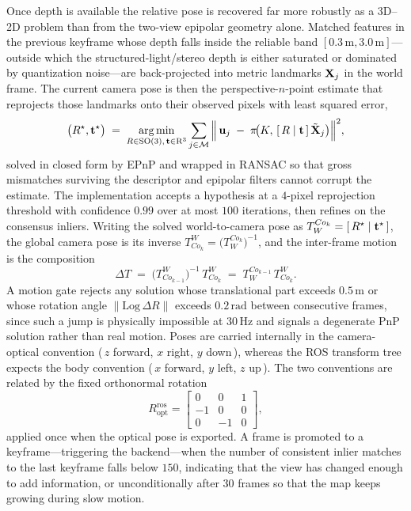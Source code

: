 Once depth is available the relative pose is recovered far more robustly as a 3D--2D problem than from the two-view epipolar geometry alone. Matched features in the previous keyframe whose depth falls inside the reliable band $[\ensuremath{0.3\,\mathrm{m}},\ensuremath{3.0\,\mathrm{m}}]$---outside which the structured-light/stereo depth is either saturated or dominated by quantization noise---are back-projected into metric landmarks $\mathbf{X}_j$ in the world frame. The current camera pose is then the perspective-$n$-point estimate that reprojects those landmarks onto their observed pixels with least squared error,
\begin{equation}
\big(R^{\star},\mathbf{t}^{\star}\big)
\;=\;
\operatorname*{arg\,min}_{R\in\mathrm{SO}(3),\,\mathbf{t}\in\mathrm{R}^{3}}
\sum_{j\in\mathcal{M}}
\Big\lVert\, \mathbf{u}_j \;-\; \pi\!\big(K,\,[\,R \mid \mathbf{t}\,]\,\tilde{\mathbf{X}}_j\big)\Big\rVert^{2},
\label{meth:eq:pnp}
\end{equation}
solved in closed form by EPnP \cite{lepetit2009epnp} and wrapped in RANSAC \cite{fischler1981ransac} so that gross mismatches surviving the descriptor and epipolar filters cannot corrupt the estimate. The implementation accepts a hypothesis at a $4$-pixel reprojection threshold with confidence $0.99$ over at most $100$ iterations, then refines on the consensus inliers. Writing the solved world-to-camera pose as $T^{Co_k}_{W}=[\,R^{\star}\mid\mathbf{t}^{\star}\,]$, the global camera pose is its inverse $T^{W}_{Co_k}=\big(T^{Co_k}_{W}\big)^{-1}$, and the inter-frame motion is the composition
\begin{equation*}
\Delta T \;=\; \big(T^{W}_{Co_{k-1}}\big)^{-1}\,T^{W}_{Co_k}
\;=\; T^{Co_{k-1}}_{W}\,T^{W}_{Co_k}.
\end{equation*}
A motion gate rejects any solution whose translational part exceeds \ensuremath{0.5\,\mathrm{m}} or whose rotation angle $\lVert\mathrm{Log}\,\Delta R\rVert$ exceeds \ensuremath{0.2\,\mathrm{rad}} between consecutive frames, since such a jump is physically impossible at \ensuremath{30\,\mathrm{Hz}} and signals a degenerate PnP solution rather than real motion. Poses are carried internally in the camera-optical convention (\,$z$ forward, $x$ right, $y$ down\,), whereas the ROS transform tree expects the body convention (\,$x$ forward, $y$ left, $z$ up\,). The two conventions are related by the fixed orthonormal rotation
\begin{equation*}
R^{\mathrm{ros}}_{\mathrm{opt}}
=\begin{bmatrix} 0 & 0 & 1 \\ -1 & 0 & 0 \\ 0 & -1 & 0 \end{bmatrix},
\end{equation*}
applied once when the optical pose is exported. A frame is promoted to a keyframe---triggering the backend---when the number of consistent inlier matches to the last keyframe falls below $150$, indicating that the view has changed enough to add information, or unconditionally after $30$ frames so that the map keeps growing during slow motion.

